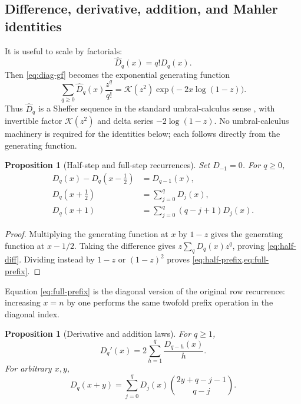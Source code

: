 \documentclass[11pt]{article}
\newtheorem{proposition}[theorem]{Proposition}
\theoremstyle{definition}
\theoremstyle{remark}
\newcommand{\K}{\mathcal K}
\newcommand{\Diag}{D}
\begin{document}
\subsection{Difference, derivative, addition, and Mahler identities}

It is useful to scale by factorials:
\begin{equation}
 \widehat\Diag_q(x)=q!\Diag_q(x).
\end{equation}
Then \cref{eq:diag-gf} becomes the exponential generating function
\begin{equation}
 \sum_{q\geq0}\widehat\Diag_q(x)\frac{z^q}{q!}
 =\K(z^2)\exp\bigl(-2x\log(1-z)\bigr).                    \label{eq:sheffer-egf}
\end{equation}
Thus \(\widehat\Diag_q\) is a Sheffer sequence in the standard umbral-calculus
sense \cite{Roman1984}, with invertible factor
\(\K(z^2)\) and delta series \(-2\log(1-z)\).  No umbral-calculus machinery
is required for the identities below; each follows directly from the
generating function.

\begin{proposition}[Half-step and full-step recurrences]
Set \(\Diag_{-1}=0\).  For \(q\geq0\),
\begin{align}
 \Diag_q(x)-\Diag_q(x-\tfrac12)&=\Diag_{q-1}(x),           \label{eq:half-diff}\\
 \Diag_q(x+\tfrac12)&=\sum_{j=0}^{q}\Diag_j(x),           \label{eq:half-prefix}\\
 \Diag_q(x+1)&=\sum_{j=0}^{q}(q-j+1)\Diag_j(x).           \label{eq:full-prefix}
\end{align}
\end{proposition}

\begin{proof}
Multiplying the generating function at \(x\) by \(1-z\) gives the generating
function at \(x-1/2\).  Taking the difference gives
\(z\sum_q\Diag_q(x)z^q\), proving \cref{eq:half-diff}.  Dividing instead by
\(1-z\) or \((1-z)^2\) proves
\cref{eq:half-prefix,eq:full-prefix}.
\end{proof}

Equation \cref{eq:full-prefix} is the diagonal version of the original row
recurrence: increasing \(x=n\) by one performs the same twofold prefix
operation in the diagonal index.

\begin{proposition}[Derivative and addition laws]
For \(q\geq1\),
\begin{equation}
 \Diag_q'(x)=2\sum_{h=1}^{q}\frac{\Diag_{q-h}(x)}{h}.       \label{eq:derivative-law}
\end{equation}
For arbitrary \(x,y\),
\begin{equation}
 \Diag_q(x+y)=\sum_{j=0}^{q}\Diag_j(x)
 \binom{2y+q-j-1}{q-j}.                                    \label{eq:addition-law}
\end{equation}
\end{proposition}
\end{document}

